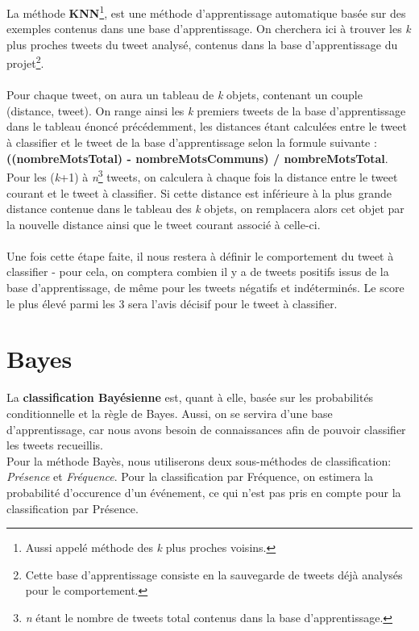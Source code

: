 \documentclass[pdftex,12pt,a4paper]{report}
\begin{document}
\begin{spacing}{1.2}
La méthode \textbf{KNN}\footnote{Aussi appelé méthode des \textit{k} plus proches voisins.}, est une méthode d'apprentissage automatique basée sur des exemples contenus dans une base d'apprentissage.
On cherchera ici à trouver les \textit{k} plus proches tweets du tweet analysé, contenus dans la base d'apprentissage du projet\footnote{Cette base d'apprentissage consiste en la sauvegarde de tweets déjà analysés pour le comportement.}.
\\
\\
Pour chaque tweet, on aura un tableau de \textit{k} objets, contenant un couple (distance, tweet). On range ainsi les \textit{k} premiers tweets de la base d'apprentissage dans le tableau énoncé précédemment, les distances étant calculées entre le tweet à classifier et le tweet de la base d'apprentissage selon la formule suivante : \textbf{((nombreMotsTotal) - nombreMotsCommuns) / nombreMotsTotal}.
\\Pour les (\textit{k}+1) à \textit{n}\footnote{\textit{n} étant le nombre de tweets total contenus dans la base d'apprentissage.} tweets, on calculera à chaque fois la distance entre le tweet courant et le tweet à classifier. Si cette distance est inférieure à la plus grande distance contenue dans le tableau des \textit{k} objets, on remplacera alors cet objet par la nouvelle distance ainsi que le tweet courant associé à celle-ci.
\\
\\
Une fois cette étape faite, il nous restera à définir le comportement du tweet à classifier - pour cela, on comptera combien il y a de tweets positifs issus de la base d'apprentissage, de même pour les tweets négatifs et indéterminés. Le score le plus élevé parmi les 3 sera l'avis décisif pour le tweet à classifier.

\section{Bayes}

La \textbf{classification Bayésienne} est, quant à elle, basée sur les probabilités conditionnelle et la règle de Bayes. Aussi, on se servira d'une base d'apprentissage, car nous avons besoin de connaissances afin de pouvoir classifier les tweets recueillis.\\
Pour la méthode Bayès, nous utiliserons deux sous-méthodes de classification: \textit{Présence} et \textit{Fréquence}. Pour la classification par Fréquence, on estimera la probabilité d'occurence d'un événement, ce qui n'est pas pris en compte pour la classification par Présence.


\end{spacing}
\end{document}
